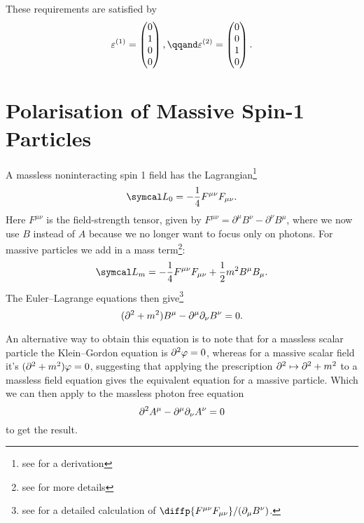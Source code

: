 These requirements are satisfied by
\begin{equation}
    \varepsilon^{(1)} = 
    \begin{pmatrix}
        0\\ 1\\ 0\\ 0
    \end{pmatrix}
    , \qqand \varepsilon^{(2)} = 
    \begin{pmatrix}
        0\\ 0\\ 1\\ 0
    \end{pmatrix}
    .
\end{equation}

\section{Polarisation of Massive Spin-1 Particles}
A massless noninteracting spin 1 field has the Lagrangian\footnote{see  for a derivation}
\begin{equation}
    \lagrangianDensity_0 = -\frac{1}{4}F^{\mu\nu}F_{\mu\nu}.
\end{equation}
Here \(F^{\mu\nu}\) is the field-strength tensor, given by \(F^{\mu\nu} = \partial^\mu B^\nu - \partial^\nu B^\mu\), where we now use \(B\) instead of \(A\) because we no longer want to focus only on photons.
For massive particles we add in a mass term\footnote{see  for more details}:
\begin{equation}
    \lagrangianDensity_m = -\frac{1}{4}F^{\mu\nu}F_{\mu\nu} + \frac{1}{2}m^2B^\mu B_\mu.
\end{equation}
The Euler--Lagrange equations then give\footnote{see  for a detailed calculation of \(\diffp{F^{\mu\nu}F_{\mu\nu}}/{(\partial_\mu B^\nu)}\).}
\begin{equation}
    (\partial^2 + m^2)B^\mu - \partial^\mu\partial_\nu B^\nu = 0.
\end{equation}

An alternative way to obtain this equation is to note that for a massless scalar particle the Klein--Gordon equation is \(\partial^2\varphi = 0\), whereas for a massive scalar field it's \((\partial^2 + m^2)\varphi = 0\), suggesting that applying the prescription \(\partial^2 \mapsto \partial^2 + m^2\) to a massless field equation gives the equivalent equation for a massive particle.
Which we can then apply to the massless photon free equation
\begin{equation}
    \partial^2 A^\mu - \partial^\mu\partial_\nu A^\nu = 0
\end{equation}
to get the result.

